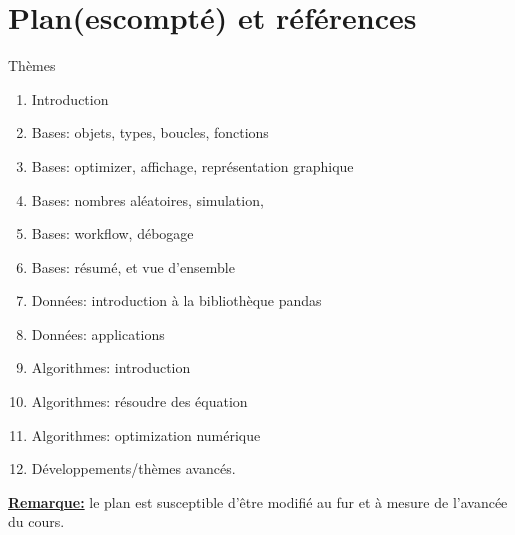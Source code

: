 \section{Plan(escompté) et références}
\frame{\sectionpage}

\begin{frame}[allowframebreaks]{Thèmes}
\begin{enumerate}
    \item Introduction
    \item Bases: objets, types, boucles, fonctions
    \item Bases: optimizer, affichage, représentation graphique
    \item Bases: nombres aléatoires, simulation,
    \item Bases: workflow, débogage
    \item Bases: résumé, et vue d'ensemble
    \item Données: introduction à la bibliothèque pandas
    \item Données: applications 
    \item Algorithmes: introduction
    \item Algorithmes: résoudre des équation
    \item Algorithmes: optimization numérique
    \item Développements/thèmes avancés.
\end{enumerate}

\underline{\textbf{Remarque:}} le plan est susceptible d'être modifié au fur et à mesure de l'avancée du cours.
\end{frame}

